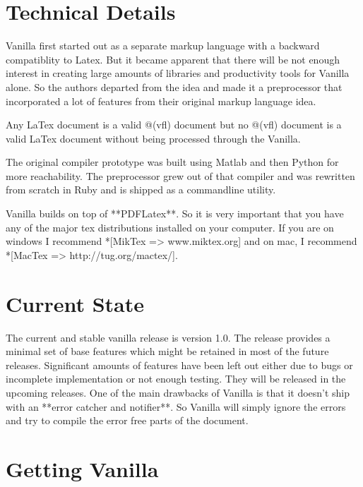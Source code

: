 \documentclass{article}
\begin{document}
\section*{Technical Details}

Vanilla first started out as a separate markup language with a backward compatiblity to Latex. But it became apparent that there will be not enough interest in creating large amounts of libraries and productivity tools for Vanilla alone. So the authors departed from the idea and made it a preprocessor that incorporated a lot of features from their original markup language idea. \vspace{5pt}

Any LaTex document is a valid @(vfl) document but no @(vfl) document is a valid LaTex document without being processed through the Vanilla. \vspace{5pt}

The original compiler prototype was built using Matlab and then Python for more reachability. The preprocessor grew out of that compiler and was rewritten from scratch in Ruby and is shipped as a commandline utility.\vspace{5pt}

Vanilla builds on top of **PDFLatex**. So it is very important that you have any of the major tex distributions installed on your computer. If you are on windows I recommend *[MikTex => www.miktex.org] and on mac, I recommend *[MacTex => http://tug.org/mactex/]. \vspace{5pt}

\section*{Current State}

The current and stable vanilla release is version 1.0. The release provides a minimal set of base features which might be retained in most of the future releases. Significant amounts of features have been left out either due to bugs or incomplete implementation or not enough testing. They will be released in the upcoming releases. One of the main drawbacks of Vanilla is that it doesn't ship with an **error catcher and notifier**.  So Vanilla will simply ignore the errors and try to compile the error free parts of the document.\vspace{5pt}

\section*{Getting Vanilla}
\end{document}
